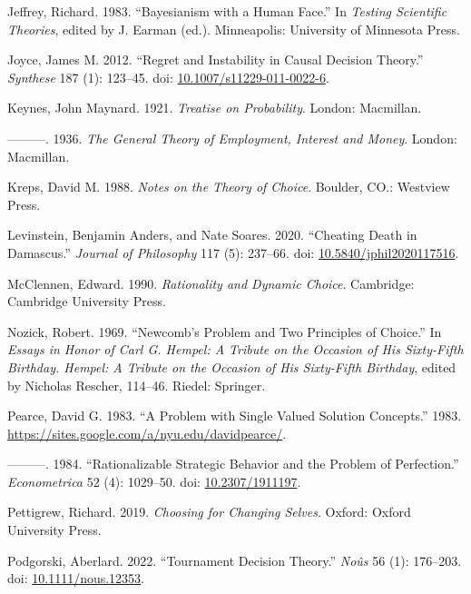 \documentclass[
  10pt,
  letterpaper,
  DIV=11,
  numbers=noendperiod,
  twoside]{scrartcl}
\newlength{\cslhangindent}
\newenvironment{CSLReferences}[2] %
 {\begin{list}{}{%
  \setlength{\itemindent}{0pt}
  \setlength{\leftmargin}{0pt}
  \setlength{\parsep}{0pt}
  \ifodd #1
   \setlength{\leftmargin}{\cslhangindent}
   \setlength{\itemindent}{-1\cslhangindent}
  \fi
  \setlength{\itemsep}{#2\baselineskip}}}
 {\end{list}}
\begin{document}
\begin{CSLReferences}{1}{0}
Jeffrey, Richard. 1983. {``Bayesianism with a Human Face.''} In
\emph{Testing Scientific Theories}, edited by J. Earman (ed.).
Minneapolis: University of Minnesota Press.

Joyce, James M. 2012. {``Regret and Instability in Causal Decision
Theory.''} \emph{Synthese} 187 (1): 123--45. doi:
\href{https://doi.org/10.1007/s11229-011-0022-6}{10.1007/s11229-011-0022-6}.

Keynes, John Maynard. 1921. \emph{Treatise on Probability}. London:
Macmillan.

---------. 1936. \emph{The General Theory of Employment, Interest and
Money}. London: Macmillan.

Kreps, David M. 1988. \emph{Notes on the Theory of Choice}. Boulder,
CO.: Westview Press.

Levinstein, Benjamin Anders, and Nate Soares. 2020. {``Cheating Death in
Damascus.''} \emph{Journal of Philosophy} 117 (5): 237--66. doi:
\href{https://doi.org/10.5840/jphil2020117516}{10.5840/jphil2020117516}.

McClennen, Edward. 1990. \emph{Rationality and Dynamic Choice}.
Cambridge: {C}ambridge {U}niversity {P}ress.

Nozick, Robert. 1969. {``Newcomb's Problem and Two Principles of
Choice.''} In \emph{Essays in Honor of Carl {G}. Hempel: A Tribute on
the Occasion of His Sixty-Fifth Birthday. Hempel: A Tribute on the
Occasion of His Sixty-Fifth Birthday}, edited by Nicholas Rescher,
114--46. Riedel: Springer.

Pearce, David G. 1983. {``A Problem with Single Valued Solution
Concepts.''} 1983.
\url{https://sites.google.com/a/nyu.edu/davidpearce/}.

---------. 1984. {``Rationalizable Strategic Behavior and the Problem of
Perfection.''} \emph{Econometrica} 52 (4): 1029--50. doi:
\href{https://doi.org/10.2307/1911197}{10.2307/1911197}.

Pettigrew, Richard. 2019. \emph{Choosing for Changing Selves}. Oxford:
{O}xford {U}niversity {P}ress.

Podgorski, Aberlard. 2022. {``Tournament Decision Theory.''}
\emph{No{û}s} 56 (1): 176--203. doi:
\href{https://doi.org/10.1111/nous.12353}{10.1111/nous.12353}.


\end{CSLReferences}
\end{document}
